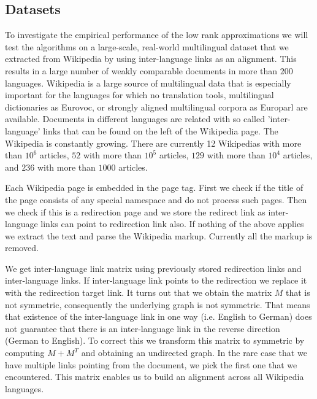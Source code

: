 \documentclass[twoside,11pt]{article}
\newcommand{\oldText}[1]{\textcolor{red}{#1:}\color{blue}}
\begin{document}
\subsection{Datasets}
To investigate the empirical performance of the low rank approximations we will test the algorithms on a large-scale, real-world multilingual dataset that we extracted from Wikipedia by using inter-language links as an alignment. This  results in a large number of weakly comparable documents in more than $200$ languages. Wikipedia is a large source of multilingual data that is especially important for the languages for which no translation tools, multilingual dictionaries as Eurovoc, or strongly aligned multilingual corpora as Europarl are available. Documents in different languages are related with so called 'inter-language' links that can be found on the left of the Wikipedia page. The Wikipedia is constantly growing. There are currently 12 Wikipedias with more than $10^6$ articles, $52$ with more than $10^5$ articles, $129$ with more than $10^4$ articles, and $236$ with more than $1000$ articles. 

Each Wikipedia page is embedded in the page tag. First we check if the title of the page consists of any special namespace and do not process such pages. Then we check if this is a redirection page and we store the redirect link as inter-language links can point to redirection link also. If nothing of the above applies we extract the text and parse the Wikipedia markup. Currently all the markup is removed.

We get inter-language link matrix using previously stored redirection links and inter-language links. If inter-language link points to the redirection we replace it with the redirection target link. It turns out that we obtain the matrix $M$ that is not symmetric, consequently the underlying graph is not symmetric. That means that existence of the inter-language link in one way (i.e. English to German) does not guarantee that there is an inter-language link in the reverse direction (German to English). To correct this we transform this matrix to symmetric by computing $M+M^T$ and obtaining an undirected graph. In the rare case that we have multiple links pointing from the document, we pick the first one that we encountered. This matrix enables us to build an alignment across all Wikipedia languages.
\end{document}
